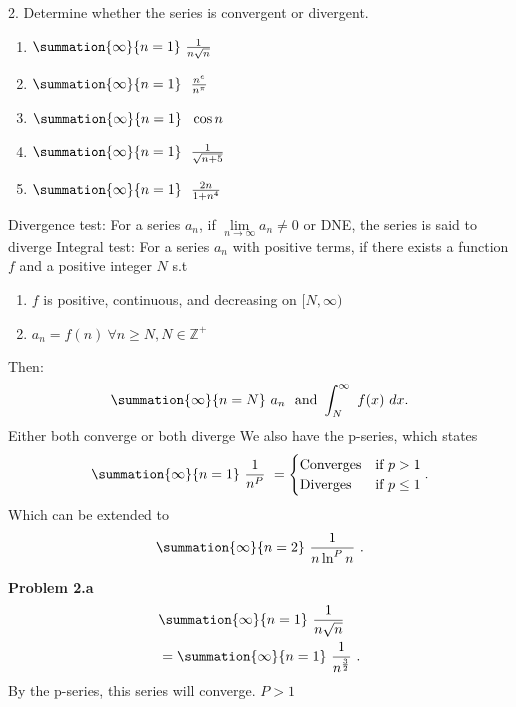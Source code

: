 \documentclass{report}
\begin{document}
    \pagebreak \bigbreak \noindent 
    \begin{mdframed}
        2. Determine whether the series is convergent or divergent.
        \begin{enumerate}[label=(\alph*)]
            \item $\summation{\infty}{n=1}\ \frac{1}{n\sqrt{n}}\ $
            \item $\summation{\infty}{n=1}\ \  \frac{n^{e}}{n^{\pi}}$ 
            \item $\summation{\infty}{n=1}\ \ \cos{n} $
            \item $\summation{\infty}{n=1}\ \  \frac{1}{\sqrt{n+5}}$
            \item $\summation{\infty}{n=1}\ \  \frac{2n}{1+n^{4}}$
        \end{enumerate}
    \end{mdframed}
    \bigbreak \noindent 
    \begin{remark}
        Divergence test: For a series $a_{n}$, if $\lim\limits_{n \to \infty}{a_{n}} \ne 0$ or DNE, the series is said to diverge
        \smallbreak \noindent
        Integral test: For a series $a_{n}$ with positive terms, if there exists a function $f$ and a positive integer $N$ s.t
        \begin{enumerate}
            \item $f$ is positive, continuous, and decreasing on $[N, \infty)$
            \item $a_{n}= f(n)\ \forall n \geq N, N \in \mathbb{Z^{+}}$ 
        \end{enumerate}
        Then:
        \begin{align*}
            \summation{\infty}{n=N}\ a_{n}\ \text{ and } \int_{N}^{\infty}\ f(x)\ dx 
        .\end{align*}
        Either both converge or both diverge
        \smallbreak \noindent
        We also have the p-series, which states
        \begin{align*}
            \summation{\infty}{n=1}\ \frac{1}{n^{P}}\    
                =
                    \begin{cases}
                        \text{Converges} & \text{if } p > 1  \\
                        \text{Diverges} & \text{if }  p \leq 1
                    \end{cases}
        .\end{align*}
    Which can be extended to 
    \begin{align*}
        \summation{\infty}{n=2}\ \frac{1}{n\ln^{P}{n}}\ 
    .\end{align*}
    \end{remark}
    \bigbreak \noindent 
    \textbf{Problem 2.a}
    \begin{align*}
        &\summation{\infty}{n=1}\ \frac{1}{n\sqrt{n}}\  \\
        &=\summation{\infty}{n=1}\ \frac{1}{n^{\frac{3}{2}}}\ 
    .\end{align*}
    By the p-series, this series will converge. $P > 1$
\end{document}
